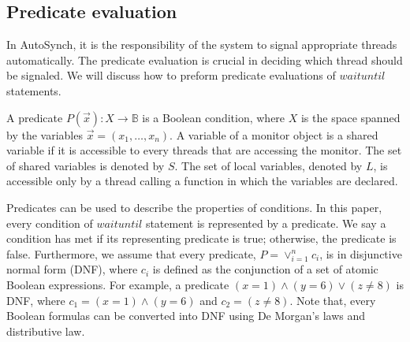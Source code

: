 \documentclass[preprint]{sigplanconf}
\begin{document}
\subsection{Predicate evaluation}
In AutoSynch, it is the responsibility of the system to signal appropriate 
threads automatically. The predicate evaluation is crucial in deciding which
thread should be signaled. We will discuss how to preform predicate evaluations
of $waituntil$ statements. 

A predicate $P(\vec{x}): X \rightarrow \mathbb{B}$ is a Boolean condition, 
where $X$ is the space spanned by the variables $\vec{x}=(x_1, \dots, x_n)$. 
A variable of a monitor object is a shared variable if it is accessible to every 
threads that are accessing the monitor. The set of shared variables is denoted by 
$S$. The set of local variables, denoted by $L$, is 
accessible only by a thread calling a function in which the variables are declared. 

Predicates can be used to describe the properties of conditions. In this paper,
every condition of $waituntil$ statement is represented by a predicate. We say
a condition has met if its representing predicate is true; otherwise, the
predicate is false. 
Furthermore, we assume that every predicate, $P = \vee_{i=1}^nc_i$, is in 
disjunctive normal form (DNF), where $c_i$ is defined as the conjunction of a 
set of atomic Boolean expressions. For example, a predicate $(x = 1) \wedge 
(y = 6) \vee (z \ne 8)$ is DNF, where $c_1 = (x = 1) \wedge (y = 6)$ and $c_2 = 
(z \ne 8)$. Note that, every Boolean formulas can be converted into DNF using 
De Morgan's laws and distributive law. 
\end{document}
